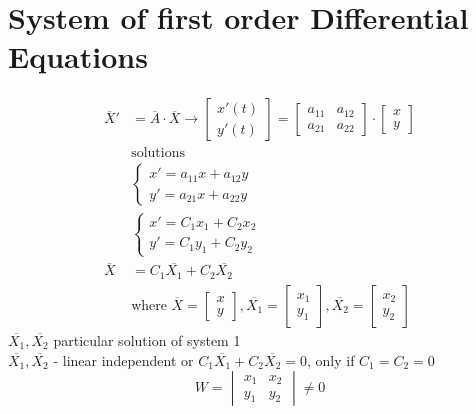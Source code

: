 \documentclass[10pt, letterpaper]{article}
\begin{document}
\section{System of first order Differential Equations}
\begin{align*}
\overline{X}' &= \overline{A} \cdot \overline{X} \rightarrow \begin{bmatrix}
	x'(t)\\
	y'(t)
\end{bmatrix} = \begin{bmatrix}
	a_{11} & a_{12}\\
	a_{21} & a_{22}
\end{bmatrix} \cdot \begin{bmatrix}
	x\\
	y
\end{bmatrix}\\
&\text{solutions}\\
&\begin{cases}
	x'=a_{11}x+a_{12}y\\
	y'=a_{21}x+a_{22}y
\end{cases}\\
&\begin{cases}
	x'=C_1x_1 +C_2x_2\\
	y'=C_1y_1 +C_2y_2
\end{cases}\\
\overline{X} &= C_1\overline{X_1}+C_2\overline{X_2}\\
&\text{where }\overline{X} = \begin{bmatrix}
	x\\
	y
\end{bmatrix}, \overline{X_1} = \begin{bmatrix}
	x_1\\
	y_1
\end{bmatrix}, \overline{X_2} = \begin{bmatrix}
	x_2\\
	y_2
\end{bmatrix}
\end{align*}
$\overline{X_1}, \overline{X_2}$ particular solution of system 1\\
$\overline{X_1}, \overline{X_2}$ - linear independent or $C_1\overline{X_1} + C_2\overline{X_2} = 0$, only if $C_1=C_2=0$\\
\begin{equation*}
W = \begin{vmatrix}
	x_1 & x_2\\
	y_1 & y_2
\end{vmatrix} \neq 0
\end{equation*}
\end{document}
